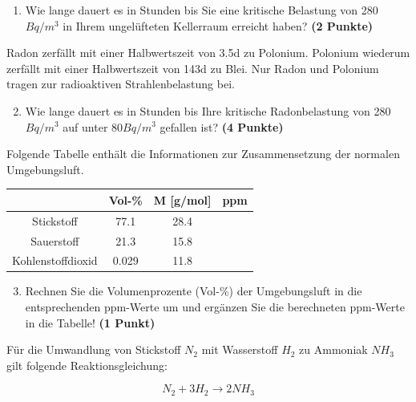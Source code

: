 \documentclass[a4paper, 10pt]{scrartcl}\usepackage[]{graphicx}\usepackage[]{xcolor}
\begin{document}
\vspace{-0.75cm}

\begin{enumerate}
\item Wie lange dauert es in Stunden bis Sie eine kritische Belastung von
  280$Bq/m^3$ in Ihrem ungel{\"u}fteten Kellerraum erreicht haben?
  \textbf{(2 Punkte)}
\end{enumerate}

Radon zerf{\"a}llt mit einer Halbwertszeit von 3.5d zu
Polonium. Polonium wiederum zerf{\"a}llt mit einer Halbwertszeit von
143d zu Blei. Nur Radon und Polonium tragen zur
radioaktiven Strahlenbelastung bei.

\begin{enumerate}
  \setcounter{enumi}{1}
\item Wie lange dauert es in Stunden bis Ihre kritische Radonbelastung von
  280$Bq/m^3$ auf unter 80$Bq/m^3$ gefallen ist?
  \textbf{(4 Punkte)}
\end{enumerate}

Folgende Tabelle enth{\"a}lt die Informationen zur Zusammensetzung der
normalen Umgebungsluft.

\begin{center}
  \begin{tabular}{ c|c|c|c }
     & Vol-\% & M [g/mol] & ppm \\
    \hline
    Stickstoff & 77.1 & 28.4 &
                                                    \phantom{1000000000000}\strut\\
        \hline
    Sauerstoff & 21.3 & 15.8 &
                                                    \phantom{10000000}\strut\\
        \hline
    Kohlenstoffdioxid & 0.029 & 11.8 & \phantom{10000000}\strut\\     
     \hline
\end{tabular}
\end{center}

\begin{enumerate}
   \setcounter{enumi}{2}
\item Rechnen Sie die Volumenprozente (Vol-\%) der Umgebungsluft in die
  entsprechenden ppm-Werte um und erg{\"a}nzen Sie die berechneten ppm-Werte in
  die Tabelle!  \textbf{(1 Punkt)}
\end{enumerate}

F{\"u}r die Umwandlung von Stickstoff $N_2$ mit Wasserstoff $H_2$ zu Ammoniak
$NH_3$ gilt folgende Reaktionsgleichung:

\begin{equation*}
  N_2 + 3H_2 \rightarrow 2NH_3
\end{equation*}  
\end{document}
